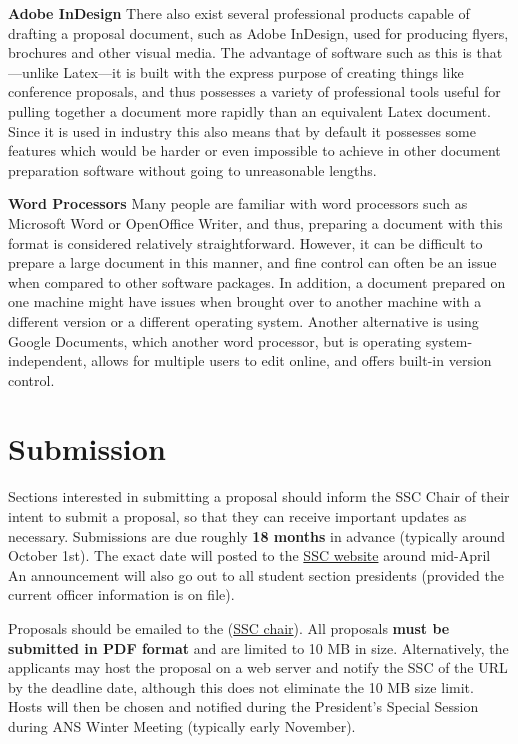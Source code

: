\documentclass[12pt]{article}
\begin{document}
\textbf{Adobe InDesign}\newline
There also exist several professional products capable of drafting a proposal document, such as Adobe InDesign, used for producing flyers, brochures and other visual media. The advantage of software such as this is that---unlike Latex---it is built with the express purpose of creating things like conference proposals, and thus possesses a variety of professional tools useful for pulling together a document more rapidly than an equivalent Latex document. Since it is used in industry this also means that by default it possesses some features which would be harder or even impossible to achieve in other document preparation software without going to unreasonable lengths.

\textbf{Word Processors}\newline
Many people are familiar with word processors such as Microsoft Word or OpenOffice Writer, and thus, preparing a document with this format is considered relatively straightforward. However, it can be difficult to prepare a large document in this manner, and fine control can often be an issue when compared to other software packages. In addition, a document prepared on one machine might have issues when brought over to another machine with a different version or a different operating system.
Another alternative is using Google Documents, which another word processor, but is operating system-independent, allows for multiple users to edit online, and offers built-in version control.

\newpage
\section{Submission}
Sections interested in submitting a proposal should inform the SSC Chair of their intent to submit a proposal, so that they can receive important updates as necessary.
Submissions are due roughly \textbf{18 months} in advance (typically around October 1st).
The exact date will posted to the \href{http://students.ans.org/THELINK}{SSC website} around mid-April
An announcement will also go out to all student section presidents (provided the current officer information is on file).

Proposals should be emailed to the (\href{mailto:sscChair@gmail.com}{SSC chair}).
All proposals \textbf{must be submitted in PDF format} and are limited to 10 MB in size.
Alternatively, the applicants may host the proposal on a web server and notify the SSC of the URL by the deadline date, although this does not eliminate the 10 MB size limit.
Hosts will then be chosen and notified during the President's Special Session during ANS Winter Meeting (typically early November).
\end{document}
